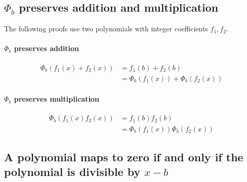 \documentclass[12pt]{article}
\begin{document}
\subsection*{$\Phi_b$ preserves addition and multiplication}

The following proofs use two polynomials with integer coefficients $f_1, f_2$.
\paragraph*{$\Phi_b$ preserves addition}
\begin{align*}
\Phi_b(f_1(x)+f_2(x)) &= f_1(b) + f_2(b)\\
&= \Phi_b(f_1(x)) + \Phi_b(f_2(x))
\end{align*}

\paragraph{$\Phi_b$ preserves multiplication}
\begin{align*}
\Phi_b(f_1(x) f_2(x)) &=  f_1(b) f_2(b)\\
&= \Phi_b(f_1(x)) \Phi_b(f_2(x))
\end{align*}


\subsection*{A polynomial maps to zero if and only if the polynomial is divisible by $x-b$}
\end{document}
